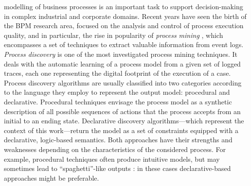 
 modelling of business processes is an important task to support decision-making in complex industrial and corporate domains. Recent years have seen the birth of the \ac{BPM} research area, focused on the analysis and control of process execution quality, and in particular, the rise in popularity of \emph{process mining} \cite{2012-Aalst}, which encompasses a set of techniques to extract valuable information from event logs. 
%
\emph{Process discovery} is one of the most investigated process mining techniques. It deals with the automatic learning of a process model from a given set of logged traces, each one representing the digital footprint of the execution of a case. 
Process discovery algorithms are usually classified into two categories according to the language they employ to represent the output model: procedural and declarative.
Procedural techniques envisage the process model as a synthetic description of all possible sequences of actions that the process accepts from an initial to an ending state. Declarative discovery algorithms---which represent the context of this work---return the model as a set of constraints equipped with a declarative, logic-based semantics. %
Both approaches have their strengths and weaknesses depending on the characteristics of the considered process. For example, procedural techniques often produce  intuitive models, but may sometimes lead to ``spaghetti''-like outputs \cite{2009-Fahland, 2018b-Maggi}: in these cases declarative-based approaches might be preferable.

